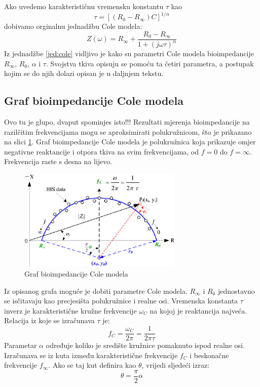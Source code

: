 \documentclass[../diplomski_rad.tex]{subfiles}
\begin{document}
Ako uvedemo karakterističnu vremensku konstantu $\tau$ kao
\begin{equation}
    \label{jed:time_const}
    \tau = [(R_{0}-R_{\infty})C]^{1/\alpha}
\end{equation}
dobivamo orginalnu jednadžbu Cole modela: 
\begin{equation}
    \label{jed:cole}
    Z(\omega) = R_{\infty}+\frac{R_{0}-R_{\infty}}{1+(j\omega\tau)^{\alpha}} 
\end{equation} 
Iz jednadžbe \ref{jed:cole} vidljivo je kako su parametri Cole modela bioimpedancije 
$R_{\infty}$, $R_{0}$, $\alpha$ i $\tau$. 
Svojstva tkiva opisuju se pomoću ta četiri parametra, a postupak kojim se do njih dolazi opisan je u daljnjem tekstu.

\subsection{Graf bioimpedancije Cole modela}
Ovo tu je glupo, dvaput spominjes isto!!!
Rezultati mjerenja bioimpedancije na razilčitim frekvencijama mogu se aproksimirati polukružnicom,  
što je prikazano na slici \ref{slk:cole_graf}. 
Graf bioimpedancije Cole modela je polukružnica koja prikazuje omjer negativne reaktancije i otpora tkiva na svim frekvencijama, 
od $f=0$ do $f=\infty$. Frekvencija raste s desna na lijevo. 

\begin{figure}[htb]
    \centering
    \includegraphics[width=0.7\textwidth]{Figures/cole_plot.png} 
    \caption{Graf bioimpedancije Cole modela \cite{Yang_2013}}
    \label{slk:cole_graf}
\end{figure}

Iz opisanog grafa moguće je dobiti parametre Cole modela\cite{Yang_2013}.
$R_{\infty}$ i $R_{0}$ jednostavno se isčitavaju kao precjesišta polukružnice i realne osi.
Vremenska konstanta $\tau$ inverz je karakteristične kružne frekvencije $\omega_{C}$ na kojoj je reaktancija najveća.
Relacija iz koje se izračunava $\tau$ je:
\begin{equation}
    \label{jed:cole}
    f_{C} = \frac{\omega_{C}}{2\pi} = \frac{1}{2\pi\tau} 
\end{equation} 
Parametar $\alpha$ određuje koliko je središte kružnice pomaknuto ispod realne osi. 
Izračunava se iz kuta između karakteristične frekvencije $f_{C}$ i beskonačne frekvencije $f_{\infty}$. 
Ako se taj kut definira kao $\theta$, vrijedi sljedeći izraz:
\begin{equation}
    \label{jed:cole}
    \theta = \frac{\pi}{2}\alpha 
\end{equation} 
\end{document}
